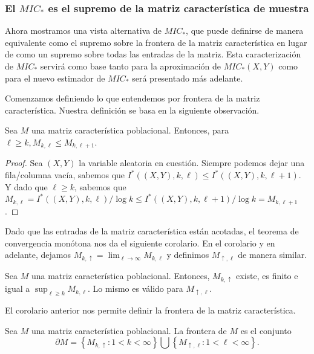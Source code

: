         \subsubsection[El MIC star es el supremo de la matriz caracteristica de muestra]{El $MIC_*$ es el supremo de la matriz caracter\'istica de muestra}
    
        Ahora mostramos una vista alternativa de $MIC_*$, que puede definirse de manera equivalente como el supremo sobre la frontera de la matriz caracter\'istica en lugar de como un supremo sobre todas las entradas de la matriz. Esta caracterizaci\'on de $MIC_*$ servir\'a como base tanto para la aproximaci\'on de $MIC_*(X, Y)$ como para el nuevo estimador de $MIC_*$ ser\'a presentado m\'as adelante.
    
        Comenzamos definiendo lo que entendemos por frontera de la matriz caracter\'istica. Nuestra definici\'on se basa en la siguiente observaci\'on.
        \begin{prop}
            Sea $M$ una matriz caracter\'istica poblacional. Entonces, para $\ell \geq k, M_{k, \ell} \leq M_{k, \ell+1}$.
        \end{prop}
        \begin{proof}
            Sea $(X, Y)$ la variable aleatoria en cuesti\'on. Siempre podemos dejar una fila/columna vac\'ia, sabemos que $I^*((X, Y), k, \ell) \leq I^*((X, Y), k, \ell+1)$. Y dado que $\ell \geq k$, sabemos que $M_{k, \ell}=I^*((X, Y), k, \ell) / \log k \leq I^*((X, Y), k, \ell+1) / \log k=M_{k, \ell+1}$.
        \end{proof}
    
        Dado que las entradas de la matriz caracter\'istica est\'an acotadas, el teorema de convergencia mon\'otona nos da el siguiente corolario. En el corolario y en adelante, dejamos $M_{k, \uparrow}=\lim _{\ell \rightarrow \infty} M_{k, \ell}$ y definimos $M_{\uparrow, \ell}$ de manera similar.

        \begin{cor}
            Sea $M$ una matriz caracter\'istica poblacional. Entonces, $M_{k, \uparrow}$ existe, es finito e igual a $\sup _{\ell \geq k} M_{k, \ell}$. Lo mismo es v\'alido para $M_{\uparrow, \ell}$. \label{cor:frontera}
        \end{cor}
    
        El corolario anterior nos permite definir la frontera de la matriz caracter\'istica.
    
        \begin{defn}
            Sea $M$ una matriz caracter\'istica poblacional. La frontera de $M$ es el conjunto
            $$
            \partial M=\left\{M_{k, \uparrow}: 1<k<\infty\right\} \bigcup\left\{M_{\uparrow, \ell}: 1<\ell<\infty\right\}.
            $$
        \end{defn}
        
